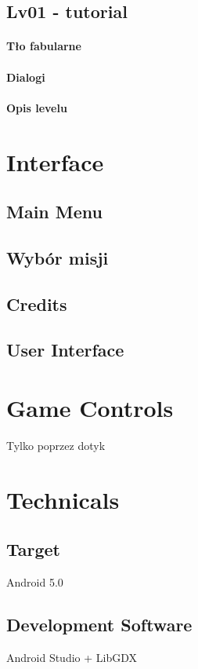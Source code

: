 \documentclass[12pt]{article}
\begin{document}
\subsection{Lv01 - tutorial}
\paragraph{Tło fabularne}
\paragraph{Dialogi}
\paragraph{Opis levelu}

\newpage
\section{Interface}
\subsection{Main Menu}
\subsection{Wybór misji}
\subsection{Credits}
\subsection{User Interface}

\newpage
\section{Game Controls}
Tylko poprzez dotyk


\newpage
\section{Technicals}
\subsection{Target}
Android 5.0
\subsection{Development Software}
Android Studio + LibGDX
\end{document}

